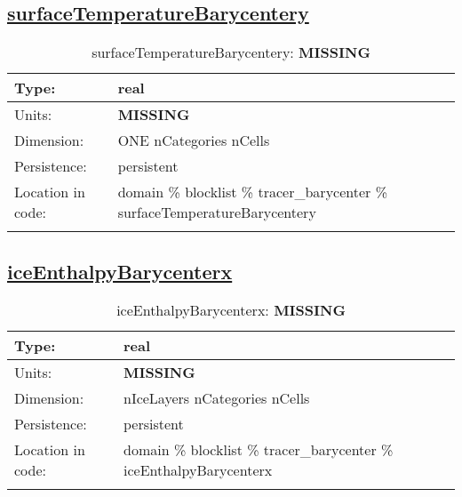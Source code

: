 \subsection[surfaceTemperatureBarycentery]{\hyperref[sec:var_tab_tracer_barycenter]{surfaceTemperatureBarycentery}}
\label{subsec:var_sec_tracer_barycenter_surfaceTemperatureBarycentery}
\begin{center}
\begin{longtable}{| p{2.0in} | p{4.0in} |}
        \hline 
        Type: & real \\
        \hline 
        Units: & {\bf \color{red} MISSING} \\
        \hline 
        Dimension: & ONE nCategories nCells \\
        \hline 
        Persistence: & persistent \\
        \hline 
         Location in code: & domain \% blocklist \% tracer\_barycenter \% surfaceTemperatureBarycentery \\
         \hline 
    \caption{surfaceTemperatureBarycentery: {\bf \color{red} MISSING}}
\end{longtable}
\end{center}
\subsection[iceEnthalpyBarycenterx]{\hyperref[sec:var_tab_tracer_barycenter]{iceEnthalpyBarycenterx}}
\label{subsec:var_sec_tracer_barycenter_iceEnthalpyBarycenterx}
\begin{center}
\begin{longtable}{| p{2.0in} | p{4.0in} |}
        \hline 
        Type: & real \\
        \hline 
        Units: & {\bf \color{red} MISSING} \\
        \hline 
        Dimension: & nIceLayers nCategories nCells \\
        \hline 
        Persistence: & persistent \\
        \hline 
         Location in code: & domain \% blocklist \% tracer\_barycenter \% iceEnthalpyBarycenterx \\
         \hline 
    \caption{iceEnthalpyBarycenterx: {\bf \color{red} MISSING}}
\end{longtable}
\end{center}
